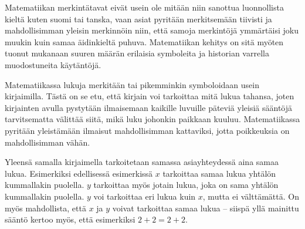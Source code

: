 \begin{esimerkki}
\end{esimerkki}

Matematiikan merkintätavat eivät usein ole mitään niin sanottua luonnollista kieltä kuten suomi tai tanska, vaan asiat pyritään merkitsemään tiivisti ja mahdollisimman yleisin merkinnöin niin, että samoja merkintöjä ymmärtäisi joku muukin kuin samaa äidinkieltä puhuva. Matematiikan kehitys on sitä myöten tuonut mukanaan suuren määrän erilaisia symboleita ja historian varrella muodostuneita käytäntöjä.

Matematiikassa lukuja merkitään tai pikemminkin symboloidaan usein kirjaimilla. Tästä on se etu, että kirjain voi tarkoittaa mitä lukua tahansa, joten kirjainten avulla pystytään ilmaisemaan kaikille luvuille päteviä yleisiä sääntöjä tarvitsematta välittää siitä, mikä luku johonkin paikkaan kuuluu. Matematiikassa pyritään yleistämään ilmaisut mahdollisimman kattaviksi, jotta poikkeuksia on mahdollisimman vähän. %

\begin{esimerkki}
\end{esimerkki}

Yleensä samalla kirjaimella tarkoitetaan samassa asiayhteydessä aina samaa lukua. Esimerkiksi edellisessä esimerkissä $x$ tarkoittaa samaa lukua yhtälön kummallakin puolella. $y$ tarkoittaa myös jotain lukua, joka on sama yhtälön kummallakin puolella. $y$ voi tarkoittaa eri lukua kuin $x$, mutta ei välttämättä. On myös mahdollista, että $x$ ja $y$ voivat tarkoittaa samaa lukua -- siispä yllä mainittu sääntö kertoo myös, että esimerkiksi $2+2=2+2$. 

